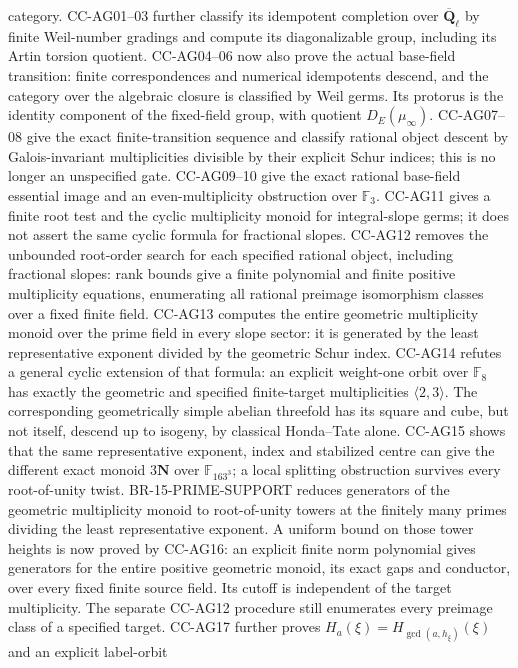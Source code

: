 \begin{description}[style=nextline,leftmargin=0pt]
category. CC-AG01--03 further classify its idempotent completion over
$\overline{\mathbf Q}_\ell$ by finite Weil-number gradings and
compute its diagonalizable group, including its Artin torsion quotient. CC-AG04--06 now also prove the
actual base-field transition: finite correspondences and numerical
idempotents descend, and the category over the algebraic closure is
classified by Weil germs. Its protorus is the identity component of
the fixed-field group, with quotient $D_E(\mu_\infty)$.
CC-AG07--08 give the exact finite-transition sequence and classify
rational object descent by Galois-invariant multiplicities divisible
by their explicit Schur indices; this is no longer an unspecified gate.
CC-AG09--10 give the exact rational base-field essential image and an
even-multiplicity obstruction over $\mathbb F_3$. CC-AG11 gives a
finite root test and the cyclic multiplicity monoid for integral-slope
germs; it does not assert the same cyclic formula for fractional slopes.
CC-AG12 removes the unbounded root-order search for each specified
rational object, including fractional slopes: rank bounds give a finite
polynomial and finite positive multiplicity equations, enumerating all
rational preimage isomorphism classes over a fixed finite field.
CC-AG13 computes the entire geometric multiplicity monoid over the
prime field in every slope sector: it is generated by the least
representative exponent divided by the geometric Schur index.
CC-AG14 refutes a general cyclic extension of that formula: an explicit
weight-one orbit over $\mathbb F_8$ has exactly the geometric and
specified finite-target multiplicities $\langle2,3\rangle$. The
corresponding geometrically simple abelian threefold has its square
and cube, but not itself, descend up to isogeny, by classical
Honda--Tate alone. CC-AG15 shows that the same representative exponent,
index and stabilized centre can give the different exact monoid
$3\mathbf N$ over $\mathbb F_{163^3}$; a local splitting obstruction
survives every root-of-unity twist. BR-15-PRIME-SUPPORT reduces generators
of the geometric multiplicity monoid to root-of-unity towers at the
finitely many primes dividing the least representative exponent. A
uniform bound on those tower heights is now proved by CC-AG16: an
explicit finite norm polynomial gives generators for the entire
positive geometric monoid, its exact gaps and conductor, over every
fixed finite source field. Its cutoff is independent of the target
multiplicity. The separate CC-AG12 procedure still enumerates every
preimage class of a specified target. CC-AG17 further proves
$H_a(\xi)=H_{\gcd(a,h_\xi)}(\xi)$ and an explicit label-orbit

\end{description}
